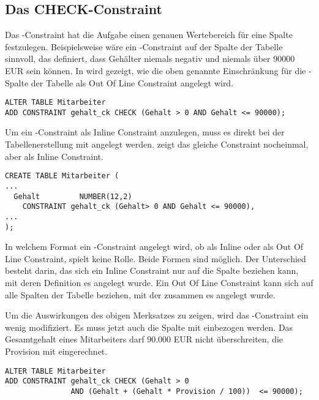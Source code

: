       \subsection{Das CHECK-Constraint}
        Das \CHECK-Constraint hat die Aufgabe einen genauen Wertebereich für
        eine Spalte festzulegen. Beispielsweise wäre ein \CHECK-Constraint
        auf der Spalte  der Tabelle 
        sinnvoll, das definiert, dass Gehälter niemals negativ und niemals
        über 90000 EUR sein können.
\clearpage
        In  wird gezeigt, wie die oben genannte
        Einschränkung für die -Spalte der Tabelle
         als Out Of Line Constraint angelegt wird.
        \begin{lstlisting}[language=oracle_sql,caption={Ein \CHECK-Constraint als Out Of Line Constraint},label=sql09_02]
ALTER TABLE Mitarbeiter
ADD CONSTRAINT gehalt_ck CHECK (Gehalt > 0 AND Gehalt <= 90000);
        \end{lstlisting}
        Um ein \CHECK-Constraint als Inline Constraint anzulegen, muss es direkt bei der Tabellenerstellung mit angelegt werden.  zeigt das gleiche Constraint nocheinmal, aber als Inline Constraint.
        \begin{lstlisting}[language=oracle_sql,caption={Ein \CHECK-Constraint als Inline Constraint},label=sql09_03]
CREATE TABLE Mitarbeiter (
...
  Gehalt         NUMBER(12,2)
    CONSTRAINT gehalt_ck (Gehalt> 0 AND Gehalt <= 90000),
...
);
        \end{lstlisting}
        \begin{merke}
          In welchem Format ein \CHECK-Constraint angelegt wird, ob als Inline oder als Out Of Line Constraint, spielt keine Rolle. Beide Formen sind möglich. Der Unterschied besteht darin, das sich ein Inline Constraint nur auf die Spalte beziehen kann, mit deren Definition es angelegt wurde. Ein Out Of Line Constraint kann sich auf alle Spalten der Tabelle beziehen, mit der zusammen es angelegt wurde.
        \end{merke}
        Um die Auswirkungen des obigen Merksatzes zu zeigen, wird das -Constraint ein wenig modifiziert. Es muss jetzt auch die Spalte  mit einbezogen werden. Das Gesamtgehalt eines Mitarbeiters darf 90.000 EUR nicht überschreiten, die Provision mit eingerechnet.
        \begin{lstlisting}[language=oracle_sql,caption={Ein komplexes \CHECK-Constraint},label=sql09_04]
ALTER TABLE Mitarbeiter
ADD CONSTRAINT gehalt_ck CHECK (Gehalt > 0
               AND (Gehalt + (Gehalt * Provision / 100))  <= 90000);
        \end{lstlisting}
		\clearpage
